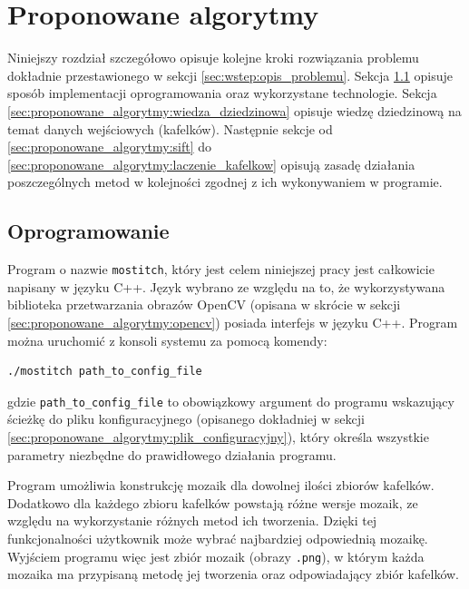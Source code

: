 %
\chapter{Proponowane algorytmy}
\label{sec:proponowane_algorytmy}

Niniejszy rozdział szczegółowo opisuje kolejne kroki rozwiązania problemu dokładnie przestawionego w sekcji \ref{sec:wstep:opis_problemu}. Sekcja \ref{sec:proponowane_algorytmy:oprogramowanie} opisuje sposób implementacji oprogramowania oraz wykorzystane technologie. Sekcja \ref{sec:proponowane_algorytmy:wiedza_dziedzinowa} opisuje wiedzę dziedzinową na temat danych wejściowych (kafelków). Następnie sekcje od \ref{sec:proponowane_algorytmy:sift} do \ref{sec:proponowane_algorytmy:laczenie_kafelkow} opisują zasadę działania poszczególnych metod w kolejności zgodnej z ich wykonywaniem w programie.

\section{Oprogramowanie}
\label{sec:proponowane_algorytmy:oprogramowanie}

Program o nazwie \texttt{mostitch}, który jest celem niniejszej pracy jest całkowicie napisany w języku C++. Język wybrano ze względu na to, że wykorzystywana biblioteka przetwarzania obrazów OpenCV (opisana w skrócie w sekcji \ref{sec:proponowane_algorytmy:opencv}) posiada interfejs w języku C++. Program można uruchomić z konsoli systemu za pomocą komendy:

\begin{verbatim}
./mostitch path_to_config_file
\end{verbatim}

gdzie \texttt{path\_to\_config\_file} to obowiązkowy argument do programu wskazujący ścieżkę do pliku konfiguracyjnego (opisanego dokładniej w sekcji \ref{sec:proponowane_algorytmy:plik_configuracyjny}), który określa wszystkie parametry niezbędne do prawidłowego działania programu.

Program umożliwia konstrukcję mozaik dla dowolnej ilości zbiorów kafelków. Dodatkowo dla każdego zbioru kafelków powstają różne wersje mozaik, ze względu na wykorzystanie różnych metod ich tworzenia. Dzięki tej funkcjonalności użytkownik może wybrać najbardziej odpowiednią mozaikę. Wyjściem programu więc jest zbiór mozaik (obrazy \texttt{.png}), w którym każda mozaika ma przypisaną metodę jej tworzenia oraz odpowiadający zbiór kafelków.

